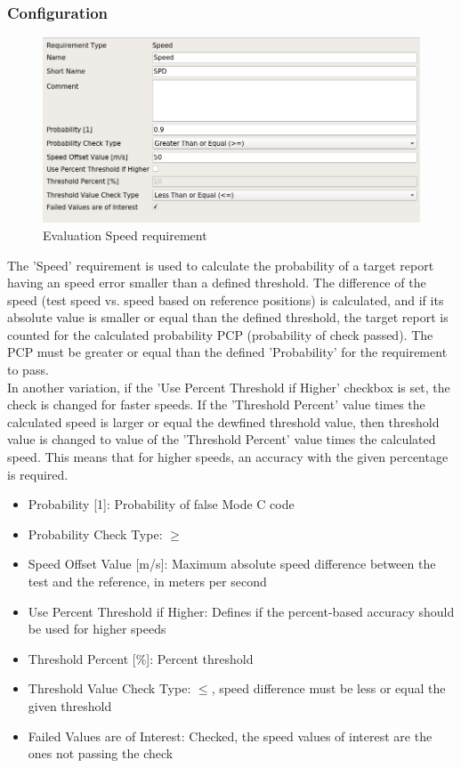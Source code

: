\subsubsection{Configuration}

\begin{figure}[H]
    \includegraphics[width=14cm,frame]{../screenshots/eval_req_speed.png}
  \caption{Evaluation Speed requirement}
\end{figure}

The 'Speed' requirement is used to calculate the probability of a target report having an speed error smaller than a defined threshold. The difference of the speed (test speed vs. speed based on reference positions) is calculated, and if its absolute value is smaller or equal than the defined threshold, the target report is counted for the calculated probability PCP (probability of check passed). The PCP must be greater or equal than the defined 'Probability' for the requirement to pass. \\

In another variation, if the 'Use Percent Threshold if Higher' checkbox is set, the check is changed for faster speeds. If the 'Threshold Percent' value times the calculated speed is larger or equal the dewfined threshold value, then threshold value is changed to value of the 'Threshold Percent' value times the calculated speed. This means that for higher speeds, an accuracy with the given percentage is required. \\

\begin{itemize}  
\item Probability [1]: Probability of false Mode C code
\item Probability Check Type: $\geq$
\item Speed Offset Value [m/s]: Maximum absolute speed difference between the test and the reference, in meters per second
\item Use Percent Threshold if Higher: Defines if the percent-based accuracy should be used for higher speeds
\item Threshold Percent [\%]: Percent threshold
\item Threshold Value Check Type: $\leq$, speed difference must be less or equal the given threshold
\item Failed Values are of Interest: Checked, the speed values of interest are the ones not passing the check
\end{itemize}
\ \\


